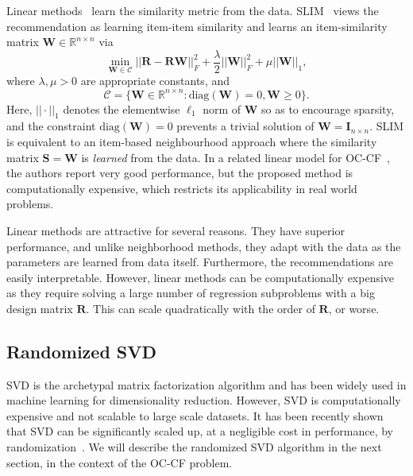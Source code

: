 \documentclass{article}
\newcommand{\citep}{\cite}
\newcommand{\id}{\mathbf{I}}
\newcommand{\Real}{\mathbb{R}}
\newcommand{\R}{\mathbf{R}}
\newcommand{\Sim}{\mathbf{S}}
\newcommand{\C}{\mathcal{C}}
\newcommand{\W}{\mathbf{W}}
\newcommand{\numItems}{n}
\begin{document}
Linear methods~\cite{Ning:2011,Sedhain:2016} learn the similarity metric from the data. SLIM~\citep{Ning:2011} views the recommendation as learning item-item similarity and learns an item-similarity matrix $\W \in \Real^{\numItems \times \numItems}$ via
\begin{equation}
\label{eqn:slim}
\min_{ \W \in \C } || \R - \R \W ||_F^2 + \frac{\lambda}{2} || \W ||_F^2 + \mu || \W ||_1,
\end{equation}
where $\lambda, \mu > 0$ are appropriate constants, and
\begin{equation}
\label{eqn:slim-constraint}
\C = \{ \W \in \Real^{\numItems \times \numItems} \colon \text{diag}( \W ) = 0, \W \geq 0 \}.
\end{equation}
Here, $|| \cdot ||_1$ denotes the elementwise $\ell_1$ norm of $\W$ so as to encourage sparsity, and the constraint $\text{diag}( \W ) = 0$ prevents a trivial solution of $\W = \id_{\numItems \times \numItems}$. SLIM is equivalent to an item-based neighbourhood approach where the similarity matrix $\Sim = \W$ is \emph{learned} from the data.
%
In a related linear model for OC-CF~\citep{Sedhain:2016}, the authors report very good performance, but the proposed method is computationally expensive, which restricts its applicability in real world problems.

Linear methods are attractive for several reasons. They have superior performance, and unlike neighborhood methods, they adapt with the data as the parameters are learned from data itself. Furthermore, the recommendations are easily interpretable. However, linear methods can be computationally expensive as they require solving a large number of regression subproblems with a big design matrix $\R$. This can scale quadratically with the order of $\R$, or worse.


\subsection{Randomized SVD}
SVD is the archetypal matrix factorization algorithm and has been widely used in machine learning for dimensionality reduction. However, SVD is computationally expensive and not scalable to large scale datasets. It has been recently shown that SVD can be significantly scaled up, at a negligible cost in performance, by randomization~\citep{halko2011}. We will describe the randomized SVD algorithm in the next section, in the context of the OC-CF problem.
\end{document}
